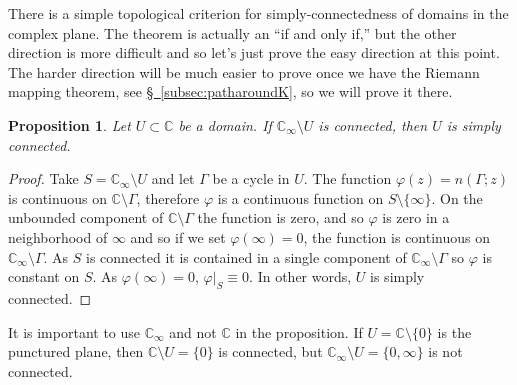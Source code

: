 \documentclass[12pt,openany]{book}
\newcommand{\C}{{\mathbb{C}}}
\newcommand{\myquote}[1]{``#1''}
\theoremstyle{plain}
\newtheorem{prop}[thm]{Proposition}
\theoremstyle{remark}
\theoremstyle{definition}
\theoremstyle{exercise}
\theoremstyle{example}
\newcommand{\subsectionref}[1]{\hyperref[#1]{\S~\ref*{#1}}}
\begin{document}
There is a simple topological criterion for
simply-connectedness of domains in the complex plane.
The theorem is actually an \myquote{if and only if,} but the other
direction is more difficult and so let's just prove the easy direction
at this point.
The harder direction will be much easier to prove once we have the Riemann
mapping theorem, see \subsectionref{subsec:patharoundK}, so we will
prove it there.

\begin{prop} \label{prop:scbycomplementeasy}
Let $U \subset \C$ be a domain.  If
$\C_\infty \setminus U$ is connected, then $U$ is simply connected.
\end{prop}

\begin{proof}
Take $S = \C_\infty \setminus U$ and let $\Gamma$ be a cycle in $U$.
The function $\varphi(z)= n(\Gamma;z)$ is continuous on 
$\C \setminus \Gamma$,
therefore $\varphi$ is a continuous function on $S \setminus \{
\infty \}$.  On the unbounded component of $\C \setminus \Gamma$ the
function is zero, and so $\varphi$ is zero in a neighborhood of $\infty$ and so
if we set $\varphi(\infty) = 0$, the function is continuous
on $\C_\infty \setminus \Gamma$.  As $S$ is connected
it is contained in
a single component of $\C_\infty \setminus \Gamma$ so $\varphi$ is
constant on $S$.  As $\varphi(\infty) = 0$, $\varphi|_S \equiv 0$.  In
other words, $U$ is simply connected.
\end{proof}

It is important to use $\C_\infty$ and not $\C$ in the proposition.
If $U = \C \setminus \{ 0 \}$ is the punctured plane, then
$\C \setminus U = \{ 0 \}$ is connected, but 
$\C_\infty \setminus U = \{ 0, \infty \}$ is not connected.
\end{document}
